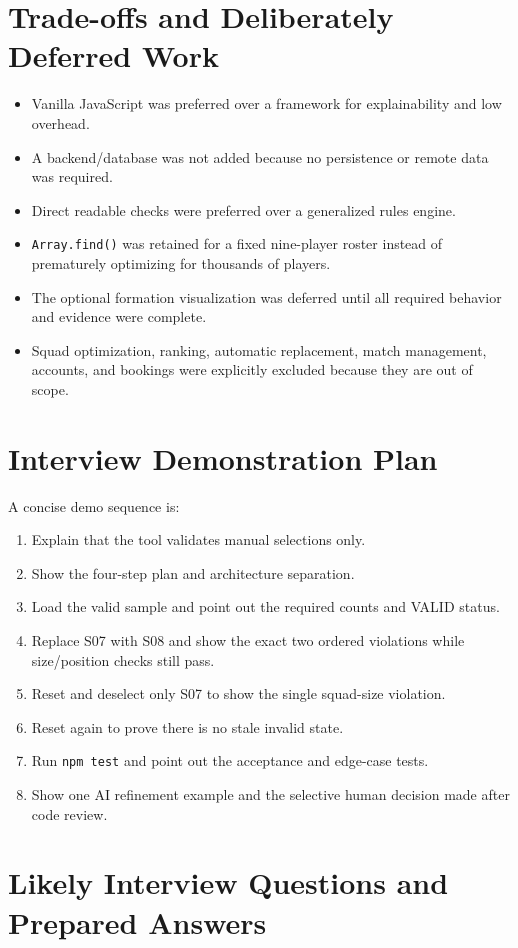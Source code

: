 \documentclass[11pt,a4paper]{article}
\begin{document}
\section{Trade-offs and Deliberately Deferred Work}
\begin{itemize}
\item Vanilla JavaScript was preferred over a framework for explainability and low overhead.
\item A backend/database was not added because no persistence or remote data was required.
\item Direct readable checks were preferred over a generalized rules engine.
\item \texttt{Array.find()} was retained for a fixed nine-player roster instead of prematurely optimizing for thousands of players.
\item The optional formation visualization was deferred until all required behavior and evidence were complete.
\item Squad optimization, ranking, automatic replacement, match management, accounts, and bookings were explicitly excluded because they are out of scope.
\end{itemize}

\section{Interview Demonstration Plan}
A concise demo sequence is:
\begin{enumerate}
\item Explain that the tool validates manual selections only.
\item Show the four-step plan and architecture separation.
\item Load the valid sample and point out the required counts and VALID status.
\item Replace S07 with S08 and show the exact two ordered violations while size/position checks still pass.
\item Reset and deselect only S07 to show the single squad-size violation.
\item Reset again to prove there is no stale invalid state.
\item Run \texttt{npm test} and point out the acceptance and edge-case tests.
\item Show one AI refinement example and the selective human decision made after code review.
\end{enumerate}

\section{Likely Interview Questions and Prepared Answers}
\end{document}
